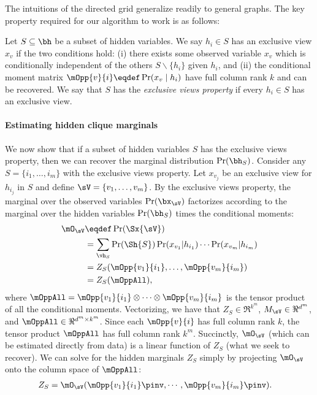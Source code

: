 The intuitions of the directed grid generalize readily to general graphs.
The key property required for our algorithm to work is as follows:
\begin{definition}
  \label{def:exclusive-views}
Let $S \subseteq \bh$ be a subset of hidden variables.
We say $h_i \in S$ has an exclusive view $x_v$
  if the two conditions hold:
  (i) there exists some observed variable
  $x_{v}$ which is conditionally independent of the others $S \backslash \{ h_i \}$ given $h_i$,
  and (ii) the conditional moment matrix $\mOpp{v}{i} \eqdef
  \Pr(x_{v} \mid h_i)$ have full column rank $k$ and can be recovered.
We say that $S$ has the \emph{exclusive views property} if every $h_i \in S$ has an exclusive view.
\end{definition}

\paragraph{Estimating hidden clique marginals}

We now show that if a subset of hidden variables $S$ has the exclusive views property,
then we can recover the marginal distribution $\Pr(\bh_S)$.
Consider any $S = \{i_1, \ldots, i_m\}$ with the exclusive views property. Let
  $x_{v_j}$ be an exclusive view for $h_{i_j}$ in $S$ and define $\sV
  = \{v_1, \ldots, v_m\}$. %
By the exclusive views property,
the marginal over the observed variables $\Pr(\bx_\sV)$
factorizes according to the marginal over the hidden variables $\Pr(\bh_S)$
times the conditional moments:
\begin{align*}
  \mO_\sV 
  &\eqdef \Pr(\Sx{\sV}) \\
  &= \sum_{\vh_S} \Pr(\Sh{S}) 
                    \Pr(x_{v_1} | h_{i_1}) \cdots \Pr(x_{v_m} | h_{i_m}) \\
  &= Z_{S}(\mOpp{v_1}{i_1},\dots,\mOpp{v_m}{i_m}) \\
  &= Z_{S}(\mOppAll),
\end{align*}
where $\mOppAll = \mOpp{v_1}{i_1} \otimes \cdots \otimes \mOpp{v_m}{i_m}$ is the tensor product of
all the conditional moments.
Vectorizing, we have that
$Z_S \in \Re^{k^m}$,
$M_\sV \in \Re^{d^m}$,
and $\mOppAll \in \Re^{d^m \times k^m}$.
Since each $\mOpp{v}{i}$ has full column rank $k$,
the tensor product $\mOppAll$ has full column rank $k^m$.
Succinctly, $\mO_\sV$ (which can be estimated directly from data)
is a linear function of $Z_S$ (what we seek to recover).
We can solve for the hidden marginals $Z_S$ simply by projecting $\mO_\sV$ onto the column
space of $\mOppAll$:
\begin{align*}
  Z_{S} &= \mO_\sV(\mOpp{v_1}{i_1}\pinv,\cdots,\mOpp{v_m}{i_m}\pinv).
\end{align*}

